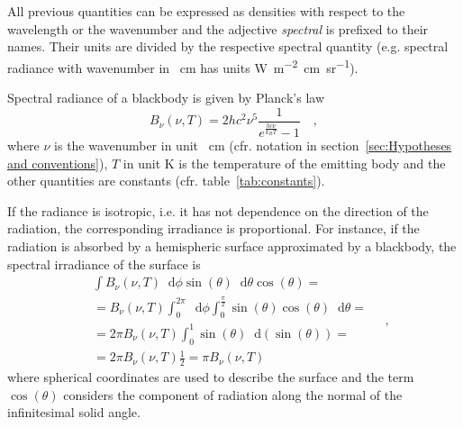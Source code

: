 \documentclass[a4paper,10pt,draft,twocolumn]{article}
\newcommand{\dd}{\mathop{}\!\mathrm{d}}
\begin{document}

All previous quantities can be expressed as densities with respect to the wavelength or the wavenumber and the adjective \emph{spectral} is prefixed to their names. Their units are divided by the respective spectral quantity (e.g. spectral radiance with wavenumber in \unit{\per\centi\metre} has units \unit{\watt\per\metre\squared\centi\metre\per\steradian}).

Spectral radiance of a blackbody is given by Planck's law
\begin{equation}
  \label{eq:blackbody_radiance}
  B_\nu (\nu, T) = 2 h c^2 \nu^5 \frac{1}{e^\frac{h c \nu}{k_B T} - 1}
  \quad ,
\end{equation}
where $\nu$ is the wavenumber in unit \unit{\per\centi\metre} (cfr. notation in section~\ref{sec:Hypotheses and conventions}), $T$ in unit \unit{\kelvin} is the temperature of the emitting body and the other quantities are constants (cfr. table~\ref{tab:constants}).

If the radiance is isotropic, i.e. it has not dependence on the direction of the radiation, the corresponding irradiance is proportional. For instance, if the radiation is absorbed by a hemispheric surface approximated by a blackbody, the spectral irradiance of the surface is
\begin{equation}
  \label{eq:blackbody_irradiance_hemisphere}
  \begin{split}
    & \int B_\nu (\nu, T) \dd \phi \sin(\theta) \dd \theta \cos(\theta) = \\
    & = B_\nu (\nu, T) \int_0^{2\pi} \dd \phi \int_0^\frac{\pi}{2} \sin(\theta) \cos(\theta) \dd \theta = \\
    & = 2 \pi B_\nu (\nu, T) \int_0^1 \sin(\theta) \dd(\sin(\theta)) = \\
    & = 2 \pi B_\nu (\nu, T) \frac{1}{2} = \pi B_\nu (\nu, T)
  \end{split}
  \quad ,
\end{equation}
where spherical coordinates are used to describe the surface and the term $\cos(\theta)$ considers the component of radiation along the normal of the infinitesimal solid angle.

\newpage
\printbibliography[heading=bibintoc]
\end{document}
